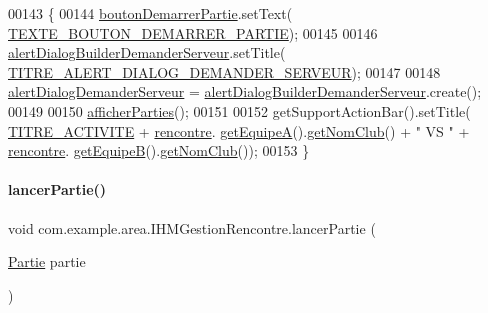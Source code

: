 \begin{DoxyCode}
00143     \{
00144         \hyperlink{classcom_1_1example_1_1area_1_1_i_h_m_gestion_rencontre_a29f52b3b1397d21728bbe60b826facd8}{boutonDemarrerPartie}.setText(
      \hyperlink{classcom_1_1example_1_1area_1_1_i_h_m_gestion_rencontre_abd01f503f5a75a27b12261b30d80c053}{TEXTE\_BOUTON\_DEMARRER\_PARTIE});
00145 
00146         \hyperlink{classcom_1_1example_1_1area_1_1_i_h_m_gestion_rencontre_a47ed7018b2af1ac9197715b9008a34a5}{alertDialogBuilderDemanderServeur}.setTitle(
      \hyperlink{classcom_1_1example_1_1area_1_1_i_h_m_gestion_rencontre_a31b8b293d8e0aa02050fddf9891349f2}{TITRE\_ALERT\_DIALOG\_DEMANDER\_SERVEUR});
00147 
00148         \hyperlink{classcom_1_1example_1_1area_1_1_i_h_m_gestion_rencontre_a9e68d97c4b50758ce1d6a2d8a217d5fc}{alertDialogDemanderServeur} = 
      \hyperlink{classcom_1_1example_1_1area_1_1_i_h_m_gestion_rencontre_a47ed7018b2af1ac9197715b9008a34a5}{alertDialogBuilderDemanderServeur}.create();
00149 
00150         \hyperlink{classcom_1_1example_1_1area_1_1_i_h_m_gestion_rencontre_a5d86e4705a4bbea19f05781403df4742}{afficherParties}();
00151 
00152         getSupportActionBar().setTitle( \hyperlink{classcom_1_1example_1_1area_1_1_i_h_m_gestion_rencontre_ae75a8de544fd03072c8dbaf6445d2589}{TITRE\_ACTIVITE} + \hyperlink{classcom_1_1example_1_1area_1_1_i_h_m_gestion_rencontre_aa3ecacbd8ab104d2a3c3f3e727ae6c5c}{rencontre}.
      \hyperlink{classcom_1_1example_1_1area_1_1_rencontre_a207498fd691285b28b0a720da0a660f8}{getEquipeA}().\hyperlink{classcom_1_1example_1_1area_1_1_equipe_a735e5e0aaac9ac2c17f3eca3d47862dc}{getNomClub}() + \textcolor{stringliteral}{" VS "} + \hyperlink{classcom_1_1example_1_1area_1_1_i_h_m_gestion_rencontre_aa3ecacbd8ab104d2a3c3f3e727ae6c5c}{rencontre}.
      \hyperlink{classcom_1_1example_1_1area_1_1_rencontre_a83deec026e26407049c5671672291170}{getEquipeB}().\hyperlink{classcom_1_1example_1_1area_1_1_equipe_a735e5e0aaac9ac2c17f3eca3d47862dc}{getNomClub}());
00153     \}
\end{DoxyCode}
\mbox{\label{classcom_1_1example_1_1area_1_1_i_h_m_gestion_rencontre_a284518fddedfaed4b257f852290e1e63}} 
\paragraph{\texorpdfstring{lancer\+Partie()}{lancerPartie()}}
{\footnotesize\ttfamily void com.\+example.\+area.\+I\+H\+M\+Gestion\+Rencontre.\+lancer\+Partie (\begin{DoxyParamCaption}\item[{\hyperlink{classcom_1_1example_1_1area_1_1_partie}{Partie}}]{partie }\end{DoxyParamCaption})\hspace{0.3cm}{\ttfamily [private]}}



